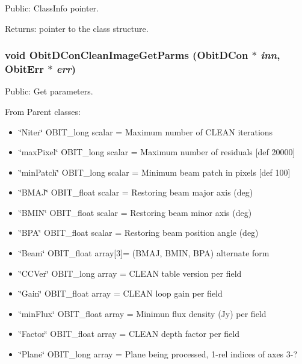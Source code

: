 Public: Class\-Info pointer. 

\begin{Desc}
\item[Returns:]pointer to the class structure. \end{Desc}
\subsubsection{\setlength{\rightskip}{0pt plus 5cm}void Obit\-DCon\-Clean\-Image\-Get\-Parms ({\bf Obit\-DCon} $\ast$ {\em inn}, {\bf Obit\-Err} $\ast$ {\em err})}\label{ObitDConCleanImage_8c_a13}


Public: Get parameters. 

From Parent classes: \begin{itemize}
\item \char`\"{}Niter\char`\"{} OBIT\_\-long scalar = Maximum number of CLEAN iterations \item \char`\"{}max\-Pixel\char`\"{} OBIT\_\-long scalar = Maximum number of residuals [def 20000] \item \char`\"{}min\-Patch\char`\"{} OBIT\_\-long scalar = Minimum beam patch in pixels [def 100] \item \char`\"{}BMAJ\char`\"{} OBIT\_\-float scalar = Restoring beam major axis (deg) \item \char`\"{}BMIN\char`\"{} OBIT\_\-float scalar = Restoring beam minor axis (deg) \item \char`\"{}BPA\char`\"{} OBIT\_\-float scalar = Restoring beam position angle (deg) \item \char`\"{}Beam\char`\"{} OBIT\_\-float array[3]= (BMAJ, BMIN, BPA) alternate form \item \char`\"{}CCVer\char`\"{} OBIT\_\-long array = CLEAN table version per field \item \char`\"{}Gain\char`\"{} OBIT\_\-float array = CLEAN loop gain per field \item \char`\"{}min\-Flux\char`\"{} OBIT\_\-float array = Minimun flux density (Jy) per field \item \char`\"{}Factor\char`\"{} OBIT\_\-float array = CLEAN depth factor per field \item \char`\"{}Plane\char`\"{} OBIT\_\-long array = Plane being processed, 1-rel indices of axes 3-? 
\end{itemize}
